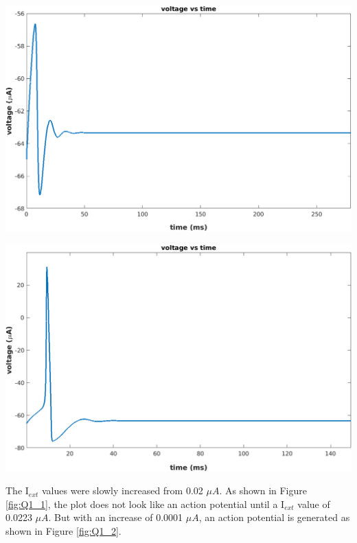 \documentclass[12pt, a4paper]{article}
\begin{document}
\begin{minipage}{0.45\linewidth}
    \includegraphics[width=\textwidth]{Q1_1}
    \label{fig:Q1_1}
\end{minipage}
\hfill
\begin{minipage}{0.45\linewidth}
    \includegraphics[width=\textwidth]{Q1_2}
    \label{fig:Q1_2}
\end{minipage}

\vspace{1em}

The I$ _{ext} $ values were slowly increased from 0.02 $ \mu A $. As shown in Figure \ref{fig:Q1_1}, the plot does not look like an action potential until a I$_{ext} $ value of 0.0223 $ \mu A $. But with an increase of 0.0001 $ \mu A $, an action potential is generated as shown in Figure \ref{fig:Q1_2}.
\end{document}
